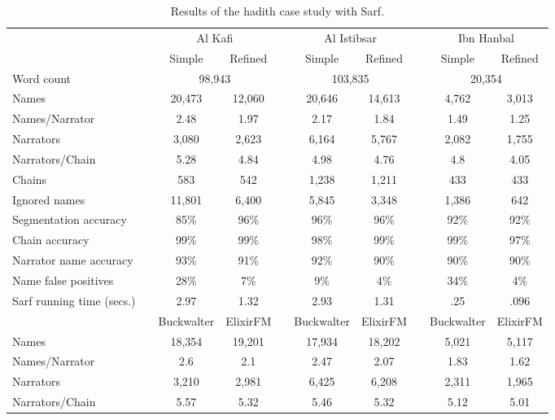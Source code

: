\documentclass[11pt]{article}
\begin{document}
\begin{table*}[bt]
\centering
\caption{Results of the hadith case study with Sarf.}
\begin{tabular}{lp{.2cm}ccp{.2cm}ccp{.2cm}cc} %
 & & \multicolumn{2}{c}{Al Kafi} & & \multicolumn{2}{c}{Al Istibsar} & &\multicolumn{2}{c}{Ibn Hanbal} \\ \cline{3-10}
 & & Simple & Refined & & Simple & Refined & & Simple  & Refined \\\bottomrule  %
Word count & &\multicolumn{2}{c}{98,943} & & \multicolumn{2}{c}{103,835} & & \multicolumn{2}{c}{20,354} \\ 
 Names      & & 20,473 & 12,060  & &20,646 &  14,613& & 4,762 & 3,013\\
Names/Narrator& &2.48 & 1.97 & & 2.17 &  1.84& & 1.49 & 1.25 \\
Narrators & &3,080 & 2,623 & & 6,164 &  5,767& & 2,082 & 1,755 \\ 
Narrators/Chain & & 5.28 & 4.84 & & 4.98&  4.76 & & 4.8 &4.05 \\
Chains & & 583 & 542 &  & 1,238& 1,211& & 433 & 433 \\ 
Ignored names & & 11,801 & 6,400 &  & 5,845 & 3,348 & & 1,386 & 642 \\ \hline
Segmentation accuracy & & 85\% & 96\%& & 96\%& 96\%& & 92\%& 92\%\\ 
Chain accuracy & & 99\% & 99\%&  & 98\%& 99\%& & 99\% & 97\% \\ 
Narrator name accuracy & & 93\% & 91\%& &  92\%& 90\% & & 90\% & 90\% \\ \hline
Name false positives & & 28\% & 7\%&  & 9\%& 4\% & & 34\% & 4\% \\ \hline
Sarf running time (secs.)& & 2.97 & 1.32 & & 2.93 & 1.31 & & .25 & .096\\ \hline \hline
 & & Buckwalter& ElixirFM & & Buckwalter & ElixirFM & & Buckwalter & ElixirFM \\\bottomrule
Names      & & 18,354 & 19,201 & & 17,934 &  18,202 & & 5,021 & 5,117 \\
Names/Narrator& & 2.6 & 2.1 & & 2.47 &  2.07 & & 1.83 & 1.62\\
Narrators & & 3,210 & 2,981 & & 6,425 &  6,208 & & 2,311 & 1,965 \\ 
Narrators/Chain & & 5.57 & 5.32 & & 5.46 &  5.32 & & 5.12 & 5.01 \\

\end{tabular}
\end{table*}
\end{document}
